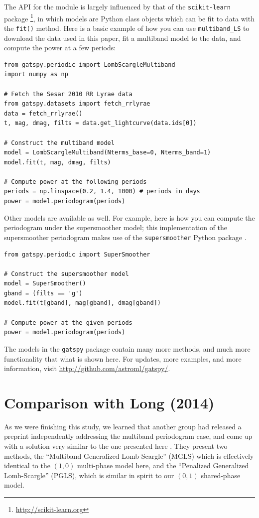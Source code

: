 \documentclass{emulateapj}
\newcommand{\sectlabel}[1]{\label{sect:#1}}
\begin{document}
The API for the module is largely influenced by that of the {\tt scikit-learn} package \citep{scikit-learn, sklearn_API}\footnote{\url{http://scikit-learn.org}}, in which models are Python class objects which can be fit to data with the \texttt{fit()} method.
Here is a basic example of how you can use {\tt multiband\_LS} to download the data used in this paper, fit a multiband model to the data, and compute the power at a few periods:

\begin{lstlisting}
from gatspy.periodic import LombScargleMultiband
import numpy as np

# Fetch the Sesar 2010 RR Lyrae data
from gatspy.datasets import fetch_rrlyrae
data = fetch_rrlyrae()
t, mag, dmag, filts = data.get_lightcurve(data.ids[0])

# Construct the multiband model
model = LombScargleMultiband(Nterms_base=0, Nterms_band=1)
model.fit(t, mag, dmag, filts)

# Compute power at the following periods
periods = np.linspace(0.2, 1.4, 1000) # periods in days
power = model.periodogram(periods)
\end{lstlisting}

Other models are available as well. For example, here is how you can compute the periodogram under the supersmoother model; this implementation of the supersmoother periodogram makes use of the \texttt{supersmoother} Python package \citep{Vanderplas2015}.

\begin{lstlisting}
from gatspy.periodic import SuperSmoother

# Construct the supersmoother model
model = SuperSmoother()
gband = (filts == 'g')
model.fit(t[gband], mag[gband], dmag[gband])

# Compute power at the given periods
power = model.periodogram(periods)
\end{lstlisting}

The models in the \texttt{gatspy} package contain many more methods, and much more functionality that what is shown here. For updates, more examples, and more information, visit \url{http://github.com/astroml/gatspy/}.


\section{Comparison with Long (2014)}
\sectlabel{long_comparison}
As we were finishing this study, we learned that another group had released a preprint independently addressing the multiband periodogram case, and come up with a solution very similar to the one presented here \citep[][hereafter LCB14]{Long2014}.
They present two methods, the ``Multiband Generalized Lomb-Scargle'' (MGLS) which is effectively identical to the $(1, 0)$ multi-phase model
here, and the ``Penalized Generalized Lomb-Scargle'' (PGLS), which is similar in spirit to our $(0, 1)$ shared-phase model.
\end{document}
